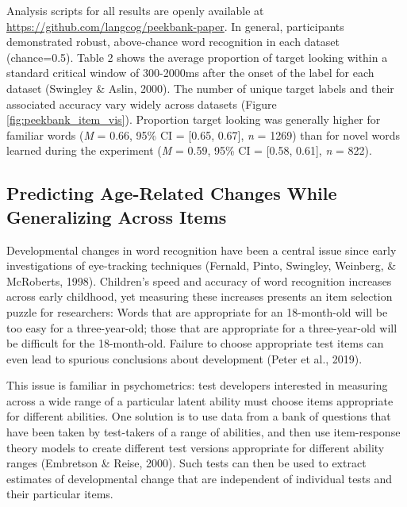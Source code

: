 \documentclass[10pt, letterpaper]{article}
\begin{document}
Analysis scripts for all results are openly available at
\url{https://github.com/langcog/peekbank-paper}. In general,
participants demonstrated robust, above-chance word recognition in each
dataset (chance=0.5). Table 2 shows the average proportion of target
looking within a standard critical window of 300-2000ms after the onset
of the label for each dataset (Swingley \& Aslin, 2000). The number of
unique target labels and their associated accuracy vary widely across
datasets (Figure \ref{fig:peekbank_item_vis}). Proportion target looking
was generally higher for familiar words (\emph{M} = 0.66, 95\% CI =
{[}0.65, 0.67{]}, \emph{n} = 1269) than for novel words learned during
the experiment (\emph{M} = 0.59, 95\% CI = {[}0.58, 0.61{]}, \emph{n} =
822).

\hypertarget{predicting-age-related-changes-while-generalizing-across-items}{%
\subsection{Predicting Age-Related Changes While Generalizing Across
Items}\label{predicting-age-related-changes-while-generalizing-across-items}}

Developmental changes in word recognition have been a central issue
since early investigations of eye-tracking techniques (Fernald, Pinto,
Swingley, Weinberg, \& McRoberts, 1998). Children's speed and accuracy
of word recognition increases across early childhood, yet measuring
these increases presents an item selection puzzle for researchers: Words
that are appropriate for an 18-month-old will be too easy for a
three-year-old; those that are appropriate for a three-year-old will be
difficult for the 18-month-old. Failure to choose appropriate test items
can even lead to spurious conclusions about development (Peter et al.,
2019).

This issue is familiar in psychometrics: test developers interested in
measuring across a wide range of a particular latent ability must choose
items appropriate for different abilities. One solution is to use data
from a bank of questions that have been taken by test-takers of a range
of abilities, and then use item-response theory models to create
different test versions appropriate for different ability ranges
(Embretson \& Reise, 2000). Such tests can then be used to extract
estimates of developmental change that are independent of individual
tests and their particular items.
\end{document}
